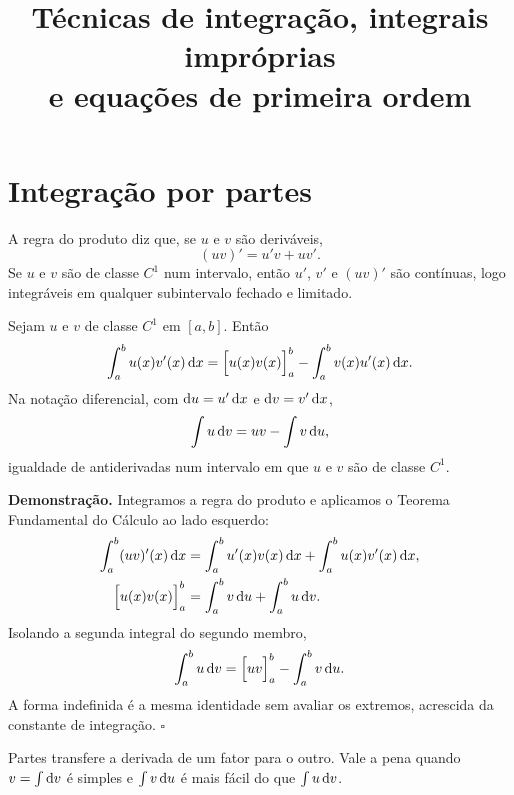 \documentclass[11pt,a4paper]{article}
\title{Técnicas de integração, integrais impróprias\\ e equações de primeira ordem}
\author{}
\date{}
\begin{document}
\maketitle
\tableofcontents


\section{Integração por partes}

A regra do produto diz que, se \(u\) e \(v\) são deriváveis,
\[
(uv)'=u'v+uv'.
\]
Se \(u\) e \(v\) são de classe \(C^1\) num intervalo, então \(u'\), \(v'\) e \((uv)'\) são contínuas, logo integráveis em qualquer subintervalo fechado e limitado.

\begin{teorema}
Sejam \(u\) e \(v\) de classe \(C^1\) em \([a,b]\). Então
\[
\int_a^b u(x)v'(x)\,\mathrm{d} x
=\Bigl[u(x)v(x)\Bigr]_a^b-\int_a^b v(x)u'(x)\,\mathrm{d} x.
\]
Na notação diferencial, com \(\mathrm{d} u=u'\,\mathrm{d} x\) e \(\mathrm{d} v=v'\,\mathrm{d} x\),
\[
\int u\,\mathrm{d} v=uv-\int v\,\mathrm{d} u,
\]
igualdade de antiderivadas num intervalo em que \(u\) e \(v\) são de classe \(C^1\).
\end{teorema}

\noindent\textbf{Demonstração.}
Integramos a regra do produto e aplicamos o Teorema Fundamental do Cálculo ao lado esquerdo:
\begin{align*}
\int_a^b (uv)'(x)\,\mathrm{d} x
&=\int_a^b u'(x)v(x)\,\mathrm{d} x+\int_a^b u(x)v'(x)\,\mathrm{d} x,\\
\Bigl[u(x)v(x)\Bigr]_a^b
&=\int_a^b v\,\mathrm{d} u+\int_a^b u\,\mathrm{d} v.
\end{align*}
Isolando a segunda integral do segundo membro,
\[
\int_a^b u\,\mathrm{d} v
=\Bigl[uv\Bigr]_a^b-\int_a^b v\,\mathrm{d} u.
\]
A forma indefinida é a mesma identidade sem avaliar os extremos, acrescida da constante de integração.
\hfill\(\square\)

\begin{intuicao}
Partes transfere a derivada de um fator para o outro. Vale a pena quando \(v=\int\mathrm{d} v\) é simples e \(\int v\,\mathrm{d} u\) é mais fácil do que \(\int u\,\mathrm{d} v\).
\end{intuicao}
\end{document}
